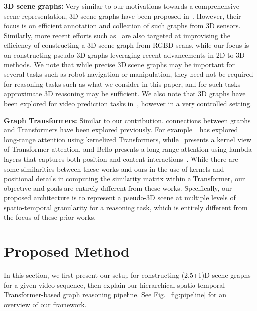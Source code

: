 \documentclass[letterpaper]{article} \usepackage{aaai22}  \usepackage{times}  \usepackage{helvet}  \usepackage{courier}  \usepackage[hyphens]{url}  \usepackage{graphicx} \urlstyle{rm} \def\UrlFont{\rm}  \usepackage{natbib}  \usepackage{caption} \DeclareCaptionStyle{ruled}{labelfont=normalfont,labelsep=colon,strut=off} \frenchspacing  \setlength{\pdfpagewidth}{8.5in}  \setlength{\pdfpageheight}{11in}  \usepackage{algorithm}
\newcommand{\name}{(2.5+1)D\xspace}
\begin{document}
\noindent\textbf{3D scene graphs:} Very similar to our motivations towards a comprehensive scene representation, 3D scene graphs have been proposed in~\cite{armeni20193d}. However, their focus is on efficient annotation and collection of such graphs from 3D sensors. Similarly, more recent efforts such as~\cite{zhang2021exploiting,wu2021scenegraphfusion} are also targeted at improvising the efficiency of constructing a 3D scene graph from RGBD scans, while our focus is on constructing pseudo-3D graphs leveraging recent advancements in 2D-to-3D methods. We note that while precise 3D scene graphs may be important for several tasks such as robot navigation or manipulation, they need not be required for reasoning tasks such as what we consider in this paper, and for such tasks approximate 3D reasoning may be sufficient. We also note that 3D graphs have been explored for video prediction tasks in~\cite{tung20203d}, however in a very controlled setting.

\noindent\textbf{Graph Transformers:} Similar to our contribution, connections between graphs and Transformers have been explored previously. For example,~\cite{choromanski2021graph} has explored long-range attention using kernelized Transformers, while~\cite{tsai2019Transformer} presents a kernel view of Transformer attention, and Bello presents a long range attention using lambda layers that captures both position and content interactions~\cite{bello2021lambdanetworks}. While there are some similarities between these works and ours in the use of kernels and positional details in computing the similarity matrix within a Transformer, our objective and goals are entirely different from these works. Specifically, our proposed architecture is to represent a pseudo-3D scene at multiple levels of spatio-temporal granularity for a reasoning task, which is entirely different from the focus of these prior works.
\section{Proposed Method}
In this section, we first present our setup for constructing \name scene graphs for a given video sequence, then explain our hierarchical spatio-temporal Transformer-based graph reasoning pipeline. See Fig.~\ref{fig:pipeline} for an overview of our framework.
\end{document}
